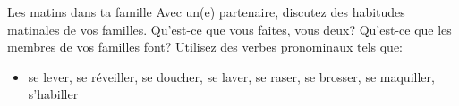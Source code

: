 \begin{frame}{Les matins dans ta famille}
  Avec un(e) partenaire, discutez des habitudes matinales de vos familles.
  Qu'est-ce que vous faites, vous deux?
  Qu'est-ce que les membres de vos familles font?
  Utilisez des verbes pronominaux tels que:
  \begin{itemize}
    \item se lever, se réveiller, se doucher, se laver, se raser, se brosser, se maquiller, s'habiller
  \end{itemize}
\end{frame}